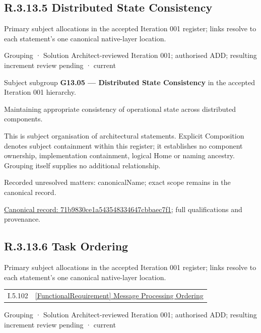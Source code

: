 \subsection*{R.3.13.5 Distributed State Consistency}
\label{navigation:R.3.13.5}

Primary subject allocations in the accepted Iteration 001 register; links resolve to each statement’s one canonical native-layer location.\par
\label{element:71b9830ce1a543548334647cbbaec7f1}
{\small Grouping · Solution Architect-reviewed Iteration 001; authorised ADD; resulting increment review pending · current}\par

Subject subgroup \textbf{G13.05 — Distributed State Consistency} in the accepted Iteration 001 hierarchy.



Maintaining appropriate consistency of operational state across distributed components.



This is subject organisation of architectural statements. Explicit Composition denotes subject containment within this register; it establishes no component ownership, implementation containment, logical Home or naming ancestry. Grouping itself supplies no additional relationship.


{\small Recorded unresolved matters: canonicalName; exact scope remains in the canonical record.}\par
{\footnotesize \href{../../../../continuum/grouping/71b9830ce1a543548334647cbbaec7f1.md}{Canonical record: 71b9830ce1a543548334647cbbaec7f1}; full qualifications and provenance.}\par
\subsection*{R.3.13.6 Task Ordering}
\label{navigation:R.3.13.6}

Primary subject allocations in the accepted Iteration 001 register; links resolve to each statement’s one canonical native-layer location.\par
\begin{longtable}{p{.22\linewidth}p{.73\linewidth}}
I.5.102 & \hyperref[element:3c11adccd7194276b787416368c13858]{[FunctionalRequirement] Message Processing Ordering} \\
\end{longtable}
\label{element:0528b2ac76c548ae861ebcb1ef9cf3d9}
{\small Grouping · Solution Architect-reviewed Iteration 001; authorised ADD; resulting increment review pending · current}\par


